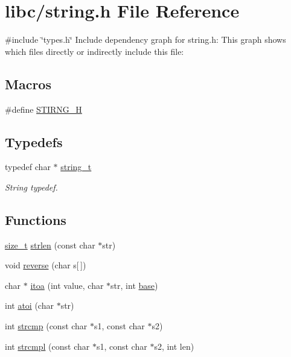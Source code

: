 \hypertarget{a00122}{}\section{libc/string.h File Reference}
\label{a00122}
{\ttfamily \#include \char`\"{}types.\+h\char`\"{}}\newline
Include dependency graph for string.\+h\+:
This graph shows which files directly or indirectly include this file\+:
\subsection*{Macros}
\begin{DoxyCompactItemize}
\item 
\#define \hyperlink{a00122_a5338bd16a174527274acc5062483b702_a5338bd16a174527274acc5062483b702}{S\+T\+I\+R\+N\+G\+\_\+H}
\end{DoxyCompactItemize}
\subsection*{Typedefs}
\begin{DoxyCompactItemize}
\item 
typedef char $\ast$ \hyperlink{a00122_ab0dcbec9b4b3c60b939b1095f93cb1b9_ab0dcbec9b4b3c60b939b1095f93cb1b9}{string\+\_\+t}
\begin{DoxyCompactList}\small\item\em String typedef. \end{DoxyCompactList}\end{DoxyCompactItemize}
\subsection*{Functions}
\begin{DoxyCompactItemize}
\item 
\hyperlink{a00134_a29d85914ddff32967d85ada69854206d_a29d85914ddff32967d85ada69854206d}{size\+\_\+t} \hyperlink{a00122_a008e171a518fe0e0352f31b245e03875_a008e171a518fe0e0352f31b245e03875}{strlen} (const char $\ast$str)
\item 
void \hyperlink{a00122_aa8a9a8836962d890b4939c112fd29190_aa8a9a8836962d890b4939c112fd29190}{reverse} (char s\mbox{[}$\,$\mbox{]})
\item 
char $\ast$ \hyperlink{a00122_ab42640268f26e065efd044cfe80591bd_ab42640268f26e065efd044cfe80591bd}{itoa} (int value, char $\ast$str, int \hyperlink{a00104_a0523cedff47e2441fc198b7770ec5d3f_a0523cedff47e2441fc198b7770ec5d3f}{base})
\item 
int \hyperlink{a00122_a8456d79947fb428e0927d19e7a1e9423_a8456d79947fb428e0927d19e7a1e9423}{atoi} (char $\ast$str)
\item 
int \hyperlink{a00122_a11bd144d7d44914099a3aeddf1c8567d_a11bd144d7d44914099a3aeddf1c8567d}{strcmp} (const char $\ast$s1, const char $\ast$s2)
\item 
int \hyperlink{a00122_a3c8c44ba2ae232bc5ae8449de1448164_a3c8c44ba2ae232bc5ae8449de1448164}{strcmpl} (const char $\ast$s1, const char $\ast$s2, int len)
\end{DoxyCompactItemize}


